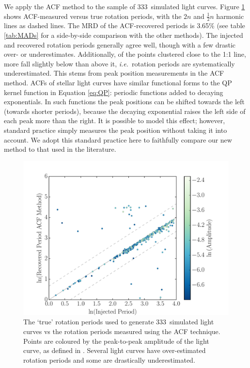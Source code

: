 \documentclass[useAMS, usenatbib, preprint, 12pt]{aastex}
\newcommand{\ie}{{\it i.e.}}
\newcommand{\naigrain}{333}
\newcommand{\percentacfMAD}{3.65}
\begin{document}
We apply the ACF method to the sample of \naigrain\ simulated light
curves.
Figure \ref{fig:compare_acf} shows ACF-measured versus true rotation
periods, with the $2n$ and $\frac{1}{2}n$ harmonic lines as dashed lines.
The MRD of the ACF-recovered periods is \percentacfMAD\% (see table
\ref{tab:MADs} for a side-by-side comparison with the other methods).
The injected and recovered rotation periods generally agree well,
though with a few drastic over- or underestimates.
Additionally, of the points clustered close to the 1:1 line,
more fall slightly below than above it, \ie\
rotation periods are systematically underestimated.
This stems from peak position measurements in the ACF method.
ACFs of stellar light curves have similar functional forms to the QP kernel
function in Equation \ref{eq:QP}: periodic functions added to decaying
exponentials.
In such functions the peak positions can be shifted towards the left
(towards shorter periods), because the decaying exponential raises the left side of
each peak more than the right.
It is possible to model this effect; however, standard practice
simply measures the peak position without taking it into account.
We adopt this standard practice here to faithfully compare
our new method to that used in the literature.

\begin{figure}
\begin{center}
\includegraphics[width=6in, clip=true]{figures/compare_acf.pdf}
\caption[ACF results.]
{The `true' rotation periods used to generate \naigrain\ simulated light
curves vs the rotation periods measured using the ACF technique.
    Points are coloured by the peak-to-peak amplitude of the light curve, as
    defined in \citet{Aigrain2015}.
    Several light curves have over-estimated rotation periods and some
    are drastically underestimated.}
\label{fig:compare_acf}
\end{center}
\end{figure}
\end{document}
